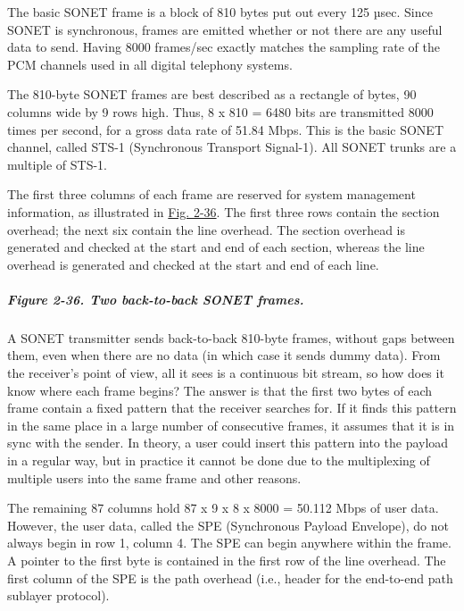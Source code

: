 The basic SONET frame is a block of 810 bytes put out every 125 µsec.
Since SONET is synchronous, frames are emitted whether or not there are
any useful data to send. Having 8000 frames/sec exactly matches the
sampling rate of the PCM channels used in all digital telephony systems.

The 810-byte SONET frames are best described as a rectangle of bytes, 90
columns wide by 9 rows high. Thus, 8 x 810 = 6480 bits are transmitted
8000 times per second, for a gross data rate of 51.84 Mbps. This is the
basic SONET channel, called {STS-1} ({Synchronous Transport Signal-1}).
All SONET trunks are a multiple of STS-1.

The first three columns of each frame are reserved for system management
information, as illustrated in
\protect\hyperlink{0130661023_ch02lev1sec5.htmlux5cux23ch02fig36}{Fig.
2-36}. The first three rows contain the section overhead; the next six
contain the line overhead. The section overhead is generated and checked
at the start and end of each section, whereas the line overhead is
generated and checked at the start and end of each line.

\subparagraph[Figure 2-36. Two back-to-back SONET
frames.]{\texorpdfstring{\protect\hypertarget{0130661023_ch02lev1sec5.htmlux5cux23ch02fig36}{}{}Figure
2-36. Two back-to-back SONET
frames.}{Figure 2-36. Two back-to-back SONET frames.}}


A SONET transmitter sends back-to-back 810-byte frames, without gaps
between them, even when there are no data (in which case it sends dummy
data). From the receiver's point of view, all it sees is a continuous
bit stream, so how does it know where each frame begins? The answer is
that the first two bytes of each frame contain a fixed pattern that the
receiver searches for. If it finds this pattern in the same place in a
large number of consecutive frames, it assumes that it is in sync with
the sender. In theory, a user could insert this pattern into the payload
in a regular way, but in practice it cannot be done due to the
multiplexing of multiple users into the same frame and other reasons.

The remaining 87 columns hold 87 x 9 x 8 x 8000 = 50.112 Mbps of user
data. However, the user data, called the {SPE} ({Synchronous Payload
Envelope}), do not always begin in row 1, column 4. The SPE can begin
anywhere within the frame. A pointer to the first byte is contained in
the first row of the line overhead. The first column of the SPE is the
path overhead (i.e., header for the end-to-end path sublayer protocol).

